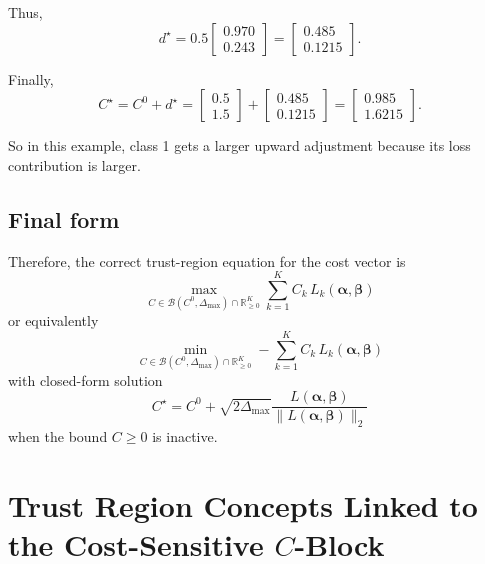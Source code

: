 \documentclass{article}
\begin{document}
Thus,
\begin{equation}
d^\star
=
0.5
\begin{bmatrix}
0.970\\
0.243
\end{bmatrix}
=
\begin{bmatrix}
0.485\\
0.1215
\end{bmatrix}.
\end{equation}

Finally,
\begin{equation}
C^\star
=
C^0+d^\star
=
\begin{bmatrix}
0.5\\
1.5
\end{bmatrix}
+
\begin{bmatrix}
0.485\\
0.1215
\end{bmatrix}
=
\begin{bmatrix}
0.985\\
1.6215
\end{bmatrix}.
\end{equation}

So in this example, class 1 gets a larger upward adjustment because its loss contribution is larger.

\subsection{Final form}

Therefore, the correct trust-region equation for the cost vector is
\begin{equation}
\boxed{
\max_{C\in \mathcal B(C^0,\Delta_{\max})\cap\mathbb R_{\ge0}^K}
\sum_{k=1}^{K} C_k\,L_k(\boldsymbol{\alpha},\boldsymbol{\beta})
}
\end{equation}
or equivalently
\begin{equation}
\boxed{
\min_{C\in \mathcal B(C^0,\Delta_{\max})\cap\mathbb R_{\ge0}^K}
-
\sum_{k=1}^{K} C_k\,L_k(\boldsymbol{\alpha},\boldsymbol{\beta})
}
\end{equation}
with closed-form solution
\begin{equation}
\boxed{
C^\star
=
C^0
+
\sqrt{2\Delta_{\max}}
\frac{L(\boldsymbol{\alpha},\boldsymbol{\beta})}{\|L(\boldsymbol{\alpha},\boldsymbol{\beta})\|_2}
}
\end{equation}
when the bound $C\ge0$ is inactive.



\section{Trust Region Concepts Linked to the Cost-Sensitive $C$-Block}
\end{document}
